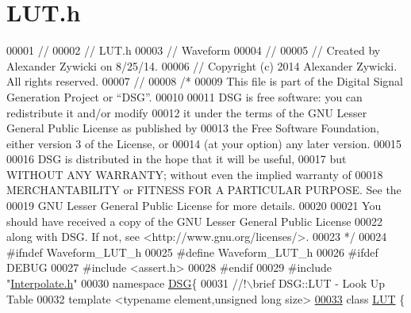 \hypertarget{_l_u_t_8h_source}{\section{L\+U\+T.\+h}
\label{_l_u_t_8h_source}
}

\begin{DoxyCode}
00001 \textcolor{comment}{//}
00002 \textcolor{comment}{//  LUT.h}
00003 \textcolor{comment}{//  Waveform}
00004 \textcolor{comment}{//}
00005 \textcolor{comment}{//  Created by Alexander Zywicki on 8/25/14.}
00006 \textcolor{comment}{//  Copyright (c) 2014 Alexander Zywicki. All rights reserved.}
00007 \textcolor{comment}{//}
00008 \textcolor{comment}{/*}
00009 \textcolor{comment}{ This file is part of the Digital Signal Generation Project or “DSG”.}
00010 \textcolor{comment}{}
00011 \textcolor{comment}{ DSG is free software: you can redistribute it and/or modify}
00012 \textcolor{comment}{ it under the terms of the GNU Lesser General Public License as published by}
00013 \textcolor{comment}{ the Free Software Foundation, either version 3 of the License, or}
00014 \textcolor{comment}{ (at your option) any later version.}
00015 \textcolor{comment}{}
00016 \textcolor{comment}{ DSG is distributed in the hope that it will be useful,}
00017 \textcolor{comment}{ but WITHOUT ANY WARRANTY; without even the implied warranty of}
00018 \textcolor{comment}{ MERCHANTABILITY or FITNESS FOR A PARTICULAR PURPOSE.  See the}
00019 \textcolor{comment}{ GNU Lesser General Public License for more details.}
00020 \textcolor{comment}{}
00021 \textcolor{comment}{ You should have received a copy of the GNU Lesser General Public License}
00022 \textcolor{comment}{ along with DSG.  If not, see <http://www.gnu.org/licenses/>.}
00023 \textcolor{comment}{ */}
00024 \textcolor{preprocessor}{#ifndef Waveform\_LUT\_h}
00025 \textcolor{preprocessor}{#define Waveform\_LUT\_h}
00026 \textcolor{preprocessor}{#ifdef DEBUG}
00027 \textcolor{preprocessor}{#include <assert.h>}
00028 \textcolor{preprocessor}{#endif}
00029 \textcolor{preprocessor}{#include "\hyperlink{_interpolate_8h}{Interpolate.h}"}
00030 \textcolor{keyword}{namespace }\hyperlink{namespace_d_s_g}{DSG}\{\textcolor{comment}{}
00031 \textcolor{comment}{    //!\(\backslash\)brief DSG::LUT - Look Up Table}
00032 \textcolor{comment}{}    \textcolor{keyword}{template} <\textcolor{keyword}{typename} element,\textcolor{keywordtype}{unsigned} \textcolor{keywordtype}{long} size>
\hypertarget{_l_u_t_8h_source_l00033}{}\hyperlink{class_d_s_g_1_1_l_u_t}{00033}     \textcolor{keyword}{class }\hyperlink{class_d_s_g_1_1_l_u_t}{LUT} \{

\end{DoxyCode}

